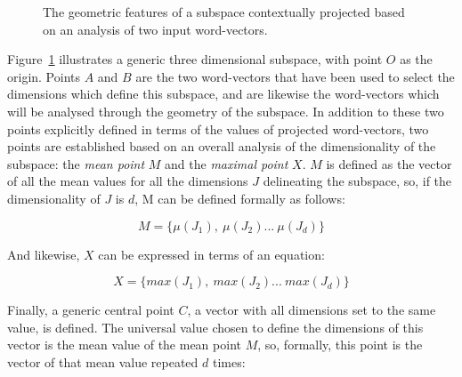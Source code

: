 \begin{figure}
\caption{The geometric features of a subspace contextually projected based on an analysis of two input word-vectors.}
\label{fig:geofull}
\end{figure}

Figure~\ref{fig:geofull} illustrates a generic three dimensional subspace, with point $O$ as the origin.  Points $A$ and $B$ are the two word-vectors that have been used to select the dimensions which define this subspace, and are likewise the word-vectors which will be analysed through the geometry of the subspace.  In addition to these two points explicitly defined in terms of the values of projected word-vectors, two points are established based on an overall analysis of the dimensionality of the subspace: the \emph{mean point} $M$ and the \emph{maximal point} $X$.  $M$ is defined as the vector of all the mean values for all the dimensions $J$ delineating the subspace, so, if the dimensionality of $J$ is $d$, M can be defined formally as follows:

\begin{equation}
M = \{\mu(J_{1}),\ \mu(J_{2})...\ \mu(J_{d})\}
\end{equation}

\noindent And likewise, $X$ can be expressed in terms of an equation:

\begin{equation}
X = \{max(J_{1}),\ max(J_{2})...\ max(J_{d})\}
\end{equation}

\noindent Finally, a generic central point $C$, a vector with all dimensions set to the same value, is defined.  The universal value chosen to define the dimensions of this vector is the mean value of the mean point $M$, so, formally, this point is the vector of that mean value repeated $d$ times:

